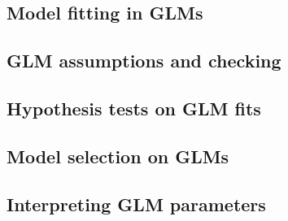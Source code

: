 \subsection{Model fitting in GLMs}

\subsection{GLM assumptions and checking}

\subsection{Hypothesis tests on GLM fits}

\subsection{Model selection on GLMs}

\subsection{Interpreting GLM parameters}